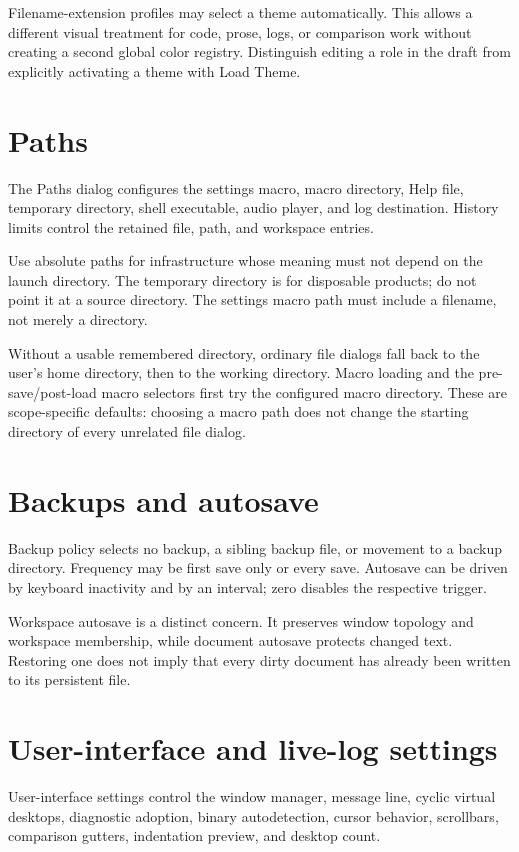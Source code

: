 \documentclass[a4paper,10pt,twoside,openany]{book}
\begin{document}
Filename-extension profiles may select a theme automatically. This allows a
different visual treatment for code, prose, logs, or comparison work without
creating a second global color registry. Distinguish editing a role in the
draft from explicitly activating a theme with Load Theme.

\section{Paths}

The Paths dialog configures the settings macro, macro directory, Help file,
temporary directory, shell executable, audio player, and log destination.
History limits control the retained file, path, and workspace entries.

Use absolute paths for infrastructure whose meaning must not depend on the
launch directory. The temporary directory is for disposable products; do not
point it at a source directory. The settings macro path must include a
filename, not merely a directory.

Without a usable remembered directory, ordinary file dialogs fall back to the
user's home directory, then to the working directory. Macro loading and the
pre-save/post-load macro selectors first try the configured macro directory.
These are scope-specific defaults: choosing a macro path does not change the
starting directory of every unrelated file dialog.
\section{Backups and autosave}

Backup policy selects no backup, a sibling backup file, or movement to a
backup directory. Frequency may be first save only or every save. Autosave can
be driven by keyboard inactivity and by an interval; zero disables the
respective trigger.

Workspace autosave is a distinct concern. It preserves window topology and
workspace membership, while document autosave protects changed text.
Restoring one does not imply that every dirty document has already been
written to its persistent file.

\section{User-interface and live-log settings}

User-interface settings control the window manager, message line, cyclic
virtual desktops, diagnostic adoption, binary autodetection, cursor behavior,
scrollbars, comparison gutters, indentation preview, and desktop count.
\end{document}
